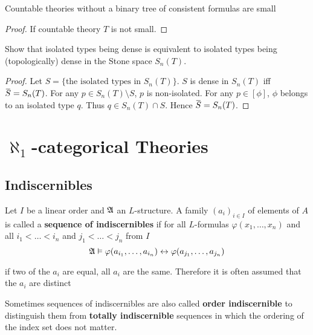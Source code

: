 \documentclass[11pt]{article}
\begin{document}
\begin{exercise}
Countable theories without a binary tree of consistent formulas are small
\end{exercise}

\begin{proof}
If countable theory \(T\) is not small.
\end{proof}

\begin{exercise}
\label{ex4.5.2}
Show that isolated types being dense is equivalent to isolated types being (topologically) dense
in the Stone space \(S_n(T)\).
\end{exercise}

\begin{proof}
Let \(S=\{\text{the isolated types in }S_n(T)\}\). \(S\) is dense in \(S_n(T)\)
iff \(\barS=S_n(T)\). For any \(p\in S_n(T)\setminus S\), \(p\) is non-isolated. For any \(p\in[\phi]\), \(\phi\)
belongs to an isolated type \(q\). Thus \(q\in S_n(T)\cap S\). Hence \(\barS=S_n(T)\).
\end{proof}



\section{\texorpdfstring{\(\aleph_1\)}{ℵ₁}-categorical Theories}
\label{sec:org75ce6e8}

\subsection{Indiscernibles}
\label{sec:org99b5bc5}
\begin{definition}[]
Let \(I\) be a linear order and \(\mathfrak{A}\) an \(L\)-structure. A family \((a_i)_{i\in I}\) of elements
of \(A\) is called a \textbf{sequence of indiscernibles}  if for all \(L\)-formulas \(\varphi(x_1,\dots,x_n)\) and
all \(i_1<\dots<i_n\) and \(j_1<\dots<j_n\) from \(I\)
\begin{equation*}
\mathfrak{A}\vDash\varphi(a_{i_1},\dots,a_{i_n})\leftrightarrow\varphi(a_{j_1},\dots,a_{j_n})
\end{equation*}
\end{definition}

if two of the \(a_i\) are equal, all \(a_i\) are the same. Therefore it is often assumed that
the \(a_i\) are distinct

Sometimes sequences of indiscernibles are also called \textbf{order indiscernible} to distinguish them
from \textbf{totally indiscernible} sequences in which the ordering of the index set does not matter.
\end{document}
